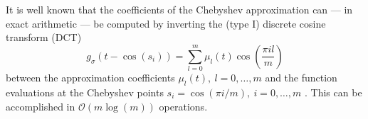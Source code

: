 It is well known that the coefficients of the Chebyshev approximation  can --- in exact arithmetic --- be computed by inverting the (type I) discrete cosine transform (DCT)
\begin{equation*}
    g_{\sigma}(t - \cos(s_i)) = \sum_{l=0}^{m} \mu_l(t) \cos\left(\frac{\pi i l}{m} \right)
    \label{equ:discrete-cosine-transform}
\end{equation*}
between the approximation coefficients $\mu_l(t),~l=0,\dots,m$ and the function evaluations at the Chebyshev points $s_i = \cos(\pi i / m),~i=0,\dots,m$ \cite{baszenski-1997-fast-polynomial, plonka-2018-numerical-fourier, trefethen-2020-approximation-theory}. This can be accomplished in $\mathcal{O}(m \log(m))$ operations.%

